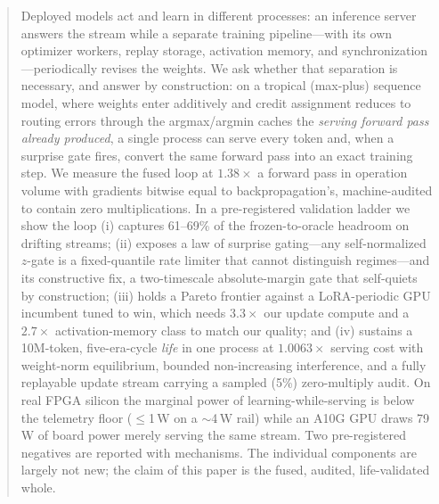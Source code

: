 \documentclass{article}
\begin{document}

\printAffiliationsAndNotice{}

\begin{abstract}
Deployed models act and learn in different processes: an inference server
answers the stream while a separate training pipeline---with its own optimizer
workers, replay storage, activation memory, and synchronization---periodically
revises the weights. We ask whether that separation is necessary, and answer
by construction: on a tropical (max-plus) sequence model, where weights enter
additively and credit assignment reduces to routing errors through the
argmax/argmin caches the \emph{serving forward pass already produced}, a
single process can serve every token and, when a surprise gate fires, convert
the same forward pass into an exact training step. We measure the fused loop
at $1.38\times$ a forward pass in operation volume with gradients bitwise
equal to backpropagation's, machine-audited to contain zero multiplications.
In a pre-registered validation ladder we show the loop (i) captures
61--69\% of the frozen-to-oracle headroom on drifting streams; (ii) exposes a
law of surprise gating---any self-normalized $z$-gate is a fixed-quantile rate
limiter that cannot distinguish regimes---and its constructive fix, a
two-timescale absolute-margin gate that self-quiets by construction; (iii)
holds a Pareto frontier against a LoRA-periodic GPU incumbent tuned to win,
which needs $3.3\times$ our update compute and a $2.7\times$ activation-memory
class to match our quality; and (iv) sustains a 10M-token, five-era-cycle
\emph{life} in one process at $1.0063\times$ serving cost with weight-norm
equilibrium, bounded non-increasing interference, and a fully replayable
update stream carrying a sampled (5\%) zero-multiply audit. On real FPGA silicon the marginal power of learning-while-serving is
below the telemetry floor ($\le$1\,W on a $\sim$4\,W rail) while an A10G GPU
draws 79\,W of board power merely serving the same stream. Two pre-registered
negatives are reported with mechanisms. The individual components are largely
not new; the claim of this paper is the fused, audited, life-validated whole.
\end{abstract}
\end{document}
